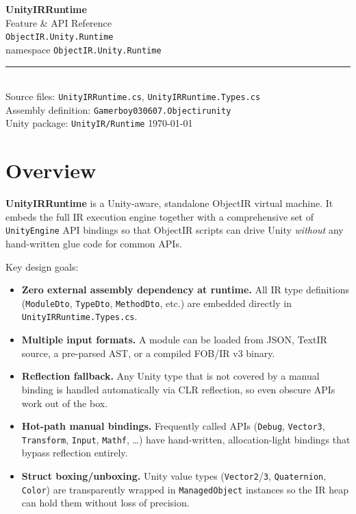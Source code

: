 \documentclass[11pt,a4paper]{article}
\newcommand{\typename}[1]{\textcolor{typecolor}{\texttt{\small #1}}}
\begin{document}
\begin{titlepage}
  \centering
  \vspace*{3cm}
  {\Huge\bfseries UnityIRRuntime}\\[0.6em]
  {\Large Feature \& API Reference}\\[2em]
  {\large\texttt{ObjectIR.Unity.Runtime}}\\[0.4em]
  {\normalsize namespace \texttt{ObjectIR.Unity.Runtime}}\\[3em]
  \rule{0.5\linewidth}{0.4pt}\\[1em]
  {\normalsize
    Source files: \texttt{UnityIRRuntime.cs}, \texttt{UnityIRRuntime.Types.cs}\\[0.3em]
    Assembly definition: \texttt{Gamerboy030607.Objectirunity}\\[0.3em]
    Unity package: \texttt{UnityIR/Runtime}
  }
  \vfill
  {\small\today}
\end{titlepage}

\tableofcontents
\newpage

\section{Overview}

\textbf{UnityIRRuntime} is a Unity-aware, standalone ObjectIR virtual machine. It
embeds the full IR execution engine together with a comprehensive set of
\texttt{UnityEngine} API bindings so that ObjectIR scripts can drive Unity
\emph{without} any hand-written glue code for common APIs.

Key design goals:

\begin{itemize}[leftmargin=1.5em]
  \item \textbf{Zero external assembly dependency at runtime.} All IR type definitions
    (\typename{ModuleDto}, \typename{TypeDto}, \typename{MethodDto}, etc.) are
    embedded directly in \texttt{UnityIRRuntime.Types.cs}.
  \item \textbf{Multiple input formats.} A module can be loaded from JSON, TextIR
    source, a pre-parsed AST, or a compiled FOB/IR v3 binary.
  \item \textbf{Reflection fallback.} Any Unity type that is not covered by a manual
    binding is handled automatically via CLR reflection, so even obscure APIs
    work out of the box.
  \item \textbf{Hot-path manual bindings.} Frequently called APIs
    (\typename{Debug}, \typename{Vector3}, \typename{Transform}, \typename{Input},
    \typename{Mathf}, \ldots) have hand-written, allocation-light bindings that
    bypass reflection entirely.
  \item \textbf{Struct boxing/unboxing.} Unity value types
    (\typename{Vector2}/\typename{3}, \typename{Quaternion}, \typename{Color}) are
    transparently wrapped in \typename{ManagedObject} instances so the IR heap
    can hold them without loss of precision.
\end{itemize}
\end{document}
